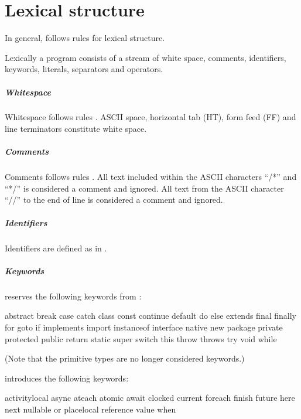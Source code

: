 \chapter{Lexical structure}

In general, \Xten{} follows \java{} rules \cite[Chapter 3]{jls2} for
lexical structure.

Lexically a program consists of a stream of white space, comments,
identifiers, keywords, literals, separators and operators.

\paragraph{Whitespace}
Whitespace  follows \java{} rules
\cite[Chapter 3.6]{jls2}. ASCII space, horizontal tab (HT), form feed (FF) and line terminators constitute white space.


\paragraph{Comments}
Comments  follows \java{} rules
\cite[Chapter 3.7]{jls2}. 
All text included within the ASCII characters ``/*'' and ``*/'' is
considered a comment and ignored. All text from the ASCII character
``//'' to the end of line is considered a comment and ignored.

\paragraph{Identifiers}
Identifiers  are defined as in \java.

\paragraph{Keywords}
\Xten{} reserves the following keywords  from \java:
\begin{x10}
abstract   break  case       catch
class      const  continue   default    
do         else   extends    final
finally    for    goto       if            
implements import instanceof interface
native     new    package    private      
protected  public return     static
super      switch this       throw
throws     try    void       while
\end{x10}
(Note that the primitive types are no longer considered keywords.)

\Xten{}  introduces the following keywords:
\begin{x10}
activitylocal async     ateach     atomic   
await         clocked   current    foreach
finish        future    here       next 
nullable      or        placelocal reference
value        when
\end{x10}

